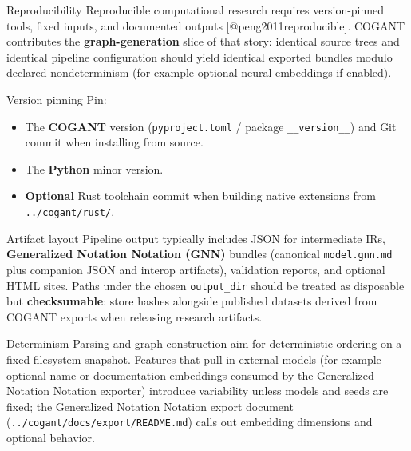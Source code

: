 \documentclass[
  ignorenonframetext,
]{beamer}
\author{\texorpdfstring{}{}}
\date{}
\providecommand{\tightlist}{%
  \setlength{\itemsep}{0pt}\setlength{\parskip}{0pt}}
\begin{document}
\begin{frame}[fragile]{Reproducibility}
\protect{}\label{reproducibility}
Reproducible computational research requires version-pinned tools, fixed
inputs, and documented outputs {[}@peng2011reproducible{]}. COGANT
contributes the \textbf{graph-generation} slice of that story: identical
source trees and identical pipeline configuration should yield identical
exported bundles modulo declared nondeterminism (for example optional
neural embeddings if enabled).

\begin{block}{Version pinning}
\protect{}\label{version-pinning}
Pin:

\begin{itemize}
\tightlist
\item
  The \textbf{COGANT} version (\texttt{pyproject.toml} / package
  \texttt{\_\_version\_\_}) and Git commit when installing from source.
\item
  The \textbf{Python} minor version.
\item
  \textbf{Optional} Rust toolchain commit when building native
  extensions from \texttt{../cogant/rust/}.
\end{itemize}
\end{block}

\begin{block}{Artifact layout}
\protect{}\label{artifact-layout}
Pipeline output typically includes JSON for intermediate IRs,
\textbf{Generalized Notation Notation (GNN)} bundles (canonical
\texttt{model.gnn.md} plus companion JSON and interop artifacts),
validation reports, and optional HTML sites. Paths under the chosen
\texttt{output\_dir} should be treated as disposable but
\textbf{checksumable}: store hashes alongside published datasets derived
from COGANT exports when releasing research artifacts.
\end{block}

\begin{block}{Determinism}
\protect{}\label{determinism}
Parsing and graph construction aim for deterministic ordering on a fixed
filesystem snapshot. Features that pull in external models (for example
optional name or documentation embeddings consumed by the Generalized
Notation Notation exporter) introduce variability unless models and
seeds are fixed; the Generalized Notation Notation export document
(\texttt{../cogant/docs/export/README.md}) calls out embedding
dimensions and optional behavior.
\end{block}


\end{frame}
\end{document}
